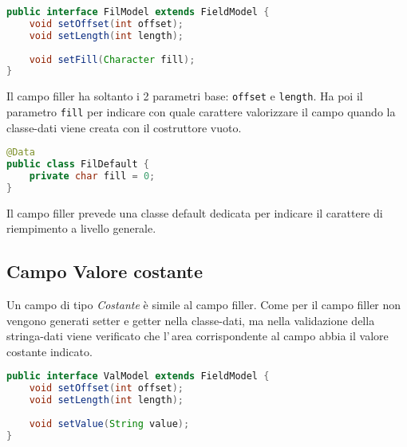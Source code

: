 \documentclass[a4paper,10pt]{report}
\begin{document}
\begin{figure*}[!htb]
\begin{lstlisting}[language=java, 
caption=interfaccia FilModel (campo filler), 
label=lst:FilModel]
public interface FilModel extends FieldModel {
    void setOffset(int offset);
    void setLength(int length);
    
    void setFill(Character fill);
}
\end{lstlisting}
\end{figure*}

Il campo filler ha soltanto i 2 parametri base: \verb!offset! e \verb!length!.
Ha poi il parametro \verb!fill! per indicare con quale carattere valorizzare il
campo quando la classe-dati viene creata con il costruttore vuoto.

\begin{figure*}[!htb]
\begin{lstlisting}[language=java, 
caption=class FilDefault (default campo filler), 
label=lst:FilDefault]
@Data
public class FilDefault {
    private char fill = 0;
}
\end{lstlisting}
\end{figure*}

Il campo filler prevede una classe default dedicata per indicare il carattere di
riempimento a livello generale.

\subsection{Campo Valore costante}
Un campo di tipo \textsl{Costante} è simile al campo filler. Come per il campo
filler non vengono generati setter e getter nella classe-dati, ma nella 
validazione della stringa-dati viene verificato che l'\,area corrispondente al 
campo abbia il valore costante indicato.

\begin{figure*}[!htb]
\begin{lstlisting}[language=java, 
caption=interfaccia ValModel (campo costante), 
label=lst:ValModel]
public interface ValModel extends FieldModel {
    void setOffset(int offset);
    void setLength(int length);
    
    void setValue(String value);
}
\end{lstlisting}
\end{figure*}
\end{document}
